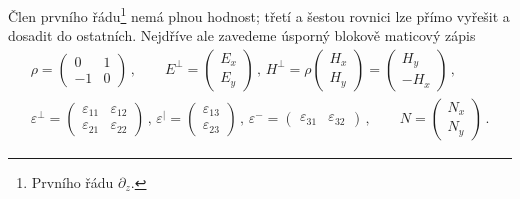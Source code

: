 Člen prvního řádu\footnote{Prvního řádu $\partial_z$.} nemá plnou hodnost; třetí a šestou rovnici lze přímo vyřešit a dosadit do ostatních.
Nejdříve ale zavedeme úsporný blokově maticový zápis
\begin{align}
\label{eqn:Berreman-blokove-znaceni}
    \rho = \begin{pmatrix}0 & 1 \\ -1 & 0\end{pmatrix}
    \,, \qquad E^\perp = \begin{pmatrix}E_x \\ E_y\end{pmatrix}
    \,, \, H^\perp = \rho \begin{pmatrix} H_x \\ H_y\end{pmatrix} = \begin{pmatrix} H_y \\ -H_x \end{pmatrix}
    \,, \\ \varepsilon^\perp=\begin{pmatrix}\varepsilon_{11} & \varepsilon_{12} \\ \varepsilon_{21} & \varepsilon_{22}\end{pmatrix}
    \,, \, \varepsilon^\vert=\begin{pmatrix} \varepsilon_{13} \\ \varepsilon_{23} \end{pmatrix}
    \,, \, \varepsilon^-=\begin{pmatrix} \varepsilon_{31} & \varepsilon_{32} \end{pmatrix}
    \,, \qquad N = \begin{pmatrix} N_x \\ N_y \end{pmatrix}
    \,.
\end{align}

